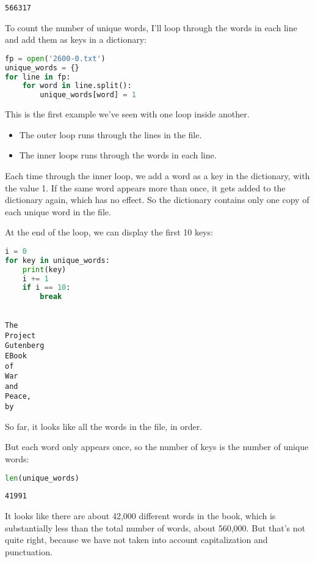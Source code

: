 \begin{lstlisting}[]
566317
\end{lstlisting}

To count the number of unique words, I'll loop through the words in each
line and add them as keys in a dictionary:

\begin{lstlisting}[language=Python]
fp = open('2600-0.txt')
unique_words = {}
for line in fp:
    for word in line.split():
        unique_words[word] = 1
\end{lstlisting}

This is the first example we've seen with one loop inside another.

\begin{itemize}
\item
  The outer loop runs through the lines in the file.
\item
  The inner loops runs through the words in each line.
\end{itemize}

Each time through the inner loop, we add a word as a key in the
dictionary, with the value 1. If the same word appears more than once,
it gets added to the dictionary again, which has no effect. So the
dictionary contains only one copy of each unique word in the file.

At the end of the loop, we can display the first 10 keys:

\begin{lstlisting}[language=Python]
i = 0
for key in unique_words:
    print(key)
    i += 1
    if i == 10:
        break
\end{lstlisting}

\begin{lstlisting}[]

The
Project
Gutenberg
EBook
of
War
and
Peace,
by
\end{lstlisting}

So far, it looks like all the words in the file, in order.

But each word only appears once, so the number of keys is the number of
unique words:

\begin{lstlisting}[language=Python]
len(unique_words)
\end{lstlisting}

\begin{lstlisting}[]
41991
\end{lstlisting}

It looks like there are about 42,000 different words in the book, which
is substantially less than the total number of words, about 560,000. But
that's not quite right, because we have not taken into account
capitalization and punctuation.

